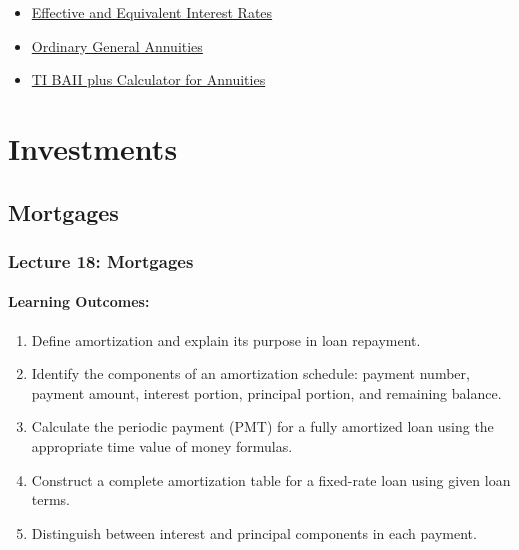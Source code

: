 \documentclass[
]{book}
\providecommand{\tightlist}{%
  \setlength{\itemsep}{0pt}\setlength{\parskip}{0pt}}
\begin{document}
\begin{itemize}
\item
  \href{https://theelementsmath.github.io/M114/annuity-basics.html\#effective-and-equivalent-interest-rates}{Effective and Equivalent Interest Rates}
\item
  \href{https://theelementsmath.github.io/M114/annuity-basics.html\#ordinary-general-annuities}{Ordinary General Annuities}
\item
  \href{https://theelementsmath.github.io/M114/annuity-basics.html\#using-the-ti-baii-plus-calculator-for-annuities}{TI BAII plus Calculator for Annuities}
\end{itemize}

\part{Investments}\label{part-investments}

\chapter{Mortgages}\label{mortgages}

\section*{Lecture 18: Mortgages}\label{lecture-18-mortgages}

\subsection*{Learning Outcomes:}\label{learning-outcomes-15}

\begin{enumerate}
\def\labelenumi{\arabic{enumi}.}
\tightlist
\item
  Define amortization and explain its purpose in loan repayment.
\item
  Identify the components of an amortization schedule: payment number, payment amount, interest portion, principal portion, and remaining balance.
\item
  Calculate the periodic payment (PMT) for a fully amortized loan using the appropriate time value of money formulas.
\item
  Construct a complete amortization table for a fixed-rate loan using given loan terms.
\item
  Distinguish between interest and principal components in each payment.
\end{enumerate}
\end{document}
